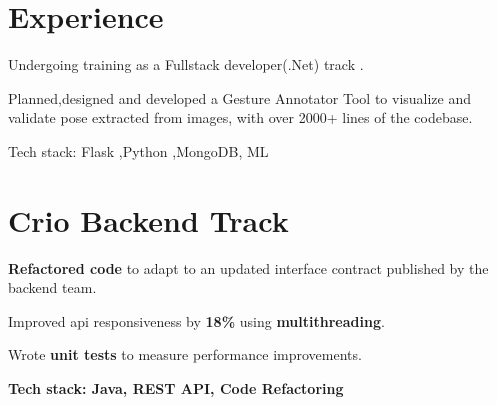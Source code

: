 \documentclass[]{deedy-resume-openfont}
\begin{document}
\begin{minipage}[t]{0.66\textwidth} 


\section{Experience}

\sectionsep

\sectionsep
{}
\vspace{\topsep} %
\begin{tightemize}\item Undergoing training as a Fullstack developer(.Net) track .
\end{tightemize}

\sectionsep

\sectionsep
{}
\vspace{\topsep} %
\begin{tightemize}\item Planned,designed and developed a Gesture Annotator Tool to visualize and
validate pose extracted from  images, with over 2000+ lines of the codebase.
\item Tech stack: Flask ,Python ,MongoDB, ML
\end{tightemize}


\sectionsep


\section{Crio Backend Track}

\descript{ \href{}{}  }

\begin{tightemize}
\item \textbf{Refactored code} to adapt to an updated interface contract published by the backend team.
\item Improved api responsiveness by \textbf{18\%} using \textbf{multithreading}.
\item Wrote \textbf{unit tests} to measure performance improvements.
\item \textbf{Tech stack: Java, REST API, Code Refactoring}
\end{tightemize}


\end{minipage}
\end{document}
